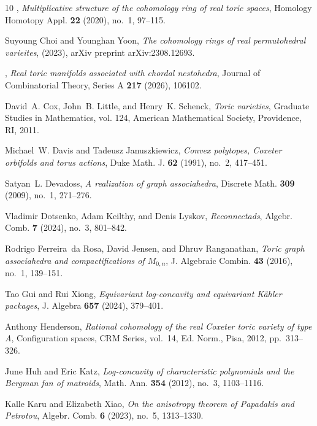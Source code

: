 \documentclass[10pt]{amsart}
\theoremstyle{plain}
\numberwithin{equation}{section}
\theoremstyle{definition}
\begin{document}
\begin{thebibliography}{10}
\bysame, \emph{Multiplicative structure of the cohomology ring of real toric
  spaces}, Homology Homotopy Appl. \textbf{22} (2020), no.~1, 97--115.

Suyoung Choi and Younghan Yoon, \emph{The cohomology rings of real
  permutohedral varieites},  (2023), arXiv preprint arXiv:2308.12693.

\bysame, \emph{Real toric manifolds associated with
  chordal nestohedra}, Journal of Combinatorial Theory, Series A \textbf{217}
  (2026), 106102.

David~A. Cox, John~B. Little, and Henry~K. Schenck, \emph{Toric varieties},
  Graduate Studies in Mathematics, vol. 124, American Mathematical Society,
  Providence, RI, 2011. 

Michael~W. Davis and Tadeusz Januszkiewicz, \emph{Convex polytopes, {C}oxeter
  orbifolds and torus actions}, Duke Math. J. \textbf{62} (1991), no.~2,
  417--451. 

Satyan~L. Devadoss, \emph{A realization of graph associahedra}, Discrete Math.
  \textbf{309} (2009), no.~1, 271--276. 

Vladimir Dotsenko, Adam Keilthy, and Denis Lyskov, \emph{Reconnectads}, Algebr.
  Comb. \textbf{7} (2024), no.~3, 801--842. 

Rodrigo Ferreira~da Rosa, David Jensen, and Dhruv Ranganathan, \emph{Toric
  graph associahedra and compactifications of {$M_{0,n}$}}, J. Algebraic
  Combin. \textbf{43} (2016), no.~1, 139--151. 

Tao Gui and Rui Xiong, \emph{Equivariant log-concavity and equivariant
  {K}\"ahler packages}, J. Algebra \textbf{657} (2024), 379--401. 

Anthony Henderson, \emph{Rational cohomology of the real {C}oxeter toric
  variety of type {A}}, Configuration spaces, CRM Series, vol.~14, Ed. Norm.,
  Pisa, 2012, pp.~313--326. 

June Huh and Eric Katz, \emph{Log-concavity of characteristic polynomials and
  the {B}ergman fan of matroids}, Math. Ann. \textbf{354} (2012), no.~3,
  1103--1116. 

Kalle Karu and Elizabeth Xiao, \emph{On the anisotropy theorem of {P}apadakis
  and {P}etrotou}, Algebr. Comb. \textbf{6} (2023), no.~5, 1313--1330.


\end{thebibliography}
\end{document}
